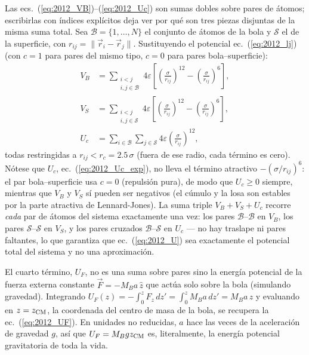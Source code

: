 \documentclass[11pt,a4paper]{article}
\newcommand{\eps}{\varepsilon}
\begin{document}
Las ecs.~(\ref{eq:2012_VB})--(\ref{eq:2012_Uc}) son sumas dobles sobre
pares de átomos; escribirlas con índices explícitos deja ver por qué son
tres piezas disjuntas de la misma suma total. Sea $\mathcal B=\{1,\ldots,
N\}$ el conjunto de átomos de la bola y $\mathcal S$ el de la superficie,
con $r_{ij}=\|\vec r_i-\vec r_j\|$. Sustituyendo el potencial
ec.~(\ref{eq:2012_lj}) (con $c=1$ para pares del mismo tipo,
$c=0$ para pares bola--superficie):
\begin{align}
V_B &= \sum_{\substack{i<j\\ i,j\in\mathcal B}}
    4\eps\left[\left(\frac{\sigma}{r_{ij}}\right)^{12}
    -\left(\frac{\sigma}{r_{ij}}\right)^{6}\right],
    \label{eq:2012_VB_exp}\\
V_S &= \sum_{\substack{i<j\\ i,j\in\mathcal S}}
    4\eps\left[\left(\frac{\sigma}{r_{ij}}\right)^{12}
    -\left(\frac{\sigma}{r_{ij}}\right)^{6}\right],
    \label{eq:2012_VS_exp}\\
U_c &= \sum_{i\in\mathcal B}\sum_{j\in\mathcal S}
    4\eps\left(\frac{\sigma}{r_{ij}}\right)^{12},
    \label{eq:2012_Uc_exp}
\end{align}
todas restringidas a $r_{ij}<r_c=2.5\,\sigma$ (fuera de ese radio, cada
término es cero). Nótese que $U_c$, ec.~(\ref{eq:2012_Uc_exp}), no lleva
el término atractivo $-(\sigma/r_{ij})^6$: el par bola--superficie usa
$c=0$ (repulsión pura), de modo que $U_c\ge0$ siempre, mientras que
$V_B$ y $V_S$ sí pueden ser negativos (el cúmulo y la losa son estables
por la parte atractiva de Lennard-Jones). La suma triple
$V_B+V_S+U_c$ recorre \emph{cada} par de átomos del sistema exactamente
una vez: los pares $\mathcal B$--$\mathcal B$ en $V_B$, los pares
$\mathcal S$--$\mathcal S$ en $V_S$, y los pares cruzados
$\mathcal B$--$\mathcal S$ en $U_c$ --- no hay traslape ni pares
faltantes, lo que garantiza que ec.~(\ref{eq:2012_U}) sea exactamente el
potencial total del sistema y no una aproximación.

El cuarto término, $U_F$, no es una suma sobre pares sino la energía
potencial de la fuerza externa constante $\vec F=-M_Ba\,\hat z$ que actúa
solo sobre la bola (simulando gravedad). Integrando
$U_F(z)=-\int_0^z F_z\,dz'=\int_0^z M_Ba\,dz'=M_Ba\,z$ y evaluando en
$z=z_{\rm CM}$, la coordenada del centro de masa de la bola, se recupera
la ec.~(\ref{eq:2012_UF}). En unidades no reducidas, $a$ hace las veces de
la aceleración de gravedad $g$, así que $U_F=M_Bgz_{\rm CM}$ es,
literalmente, la energía potencial gravitatoria de toda la vida.
\end{document}
